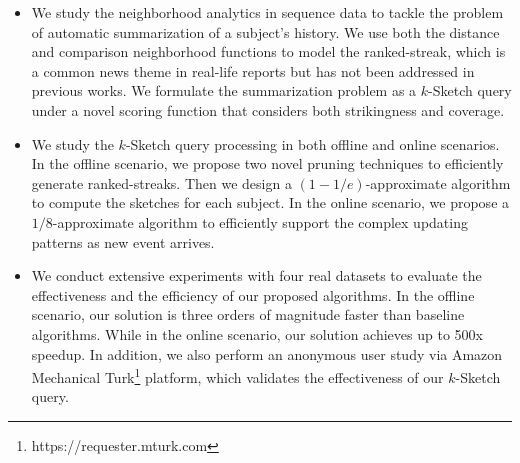 \begin{itemize}
\item We study the neighborhood analytics in sequence data to tackle the problem
of automatic summarization of a subject's history. We use both the distance and comparison
neighborhood functions to model the ranked-streak, which is a common news theme in real-life reports but has not been addressed in previous works. We formulate the summarization 
problem as a $k$-Sketch query under a novel scoring function that considers both strikingness and coverage.


\item We study the $k$-Sketch query processing in both offline and online scenarios. In the offline scenario, we propose two novel pruning techniques to efficiently generate ranked-streaks. Then we design a $(1-1/e)$-approximate algorithm to compute the sketches for each subject. In the online scenario, we propose a $1/8$-approximate algorithm to efficiently support the complex updating patterns as new event arrives.


\item We conduct extensive experiments 
with four real datasets to evaluate the effectiveness and the efficiency of our proposed algorithms. 
In the offline scenario, our solution is three orders of magnitude 
faster than baseline algorithms. While in the online scenario,
our solution achieves up to 500x speedup. In addition, 
we also perform an anonymous user study via Amazon Mechanical Turk\footnote{https://requester.mturk.com} platform,
which validates the effectiveness of our $k$-Sketch query.
\end{itemize}

